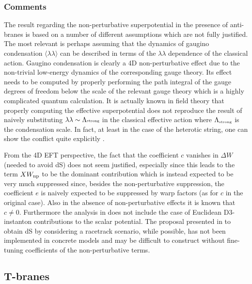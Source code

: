 \documentclass[11pt,a4paper]{article}
\def\strong{{\scriptscriptstyle {\rm strong}}}
\begin{document}
\subsubsection*{Comments}

The result regarding the non-perturbative superpotential in the presence of anti-branes is based on a number of different assumptions which are not fully justified. The most relevant is perhaps assuming that the dynamics of gaugino condensation $\langle \lambda \lambda\rangle $ can be described in terms of the $\lambda\lambda$ dependence of the classical action. Gaugino condensation is clearly a 4D non-perturbative effect due to the non-trivial low-energy dynamics of the corresponding gauge theory. Its effect needs to be computed by properly performing the path integral of the gauge degrees of freedom below the scale of the relevant gauge theory which is a highly complicated quantum calculation. It is actually known in field theory that properly computing the effective superpotential does not reproduce the result of naively substituting $\lambda\lambda\sim \Lambda\strong$ in the classical effective action where $\Lambda_\strong$ is the condensation scale. In fact, at least in the case of the heterotic string, one can show the conflict quite explicitly \cite{Brustein:2004xn,Nilles:2004zg}.

From the 4D EFT perspective, the fact that the coefficient $c$ vanishes in $\Delta W$ (needed to avoid dS) does not seem justified, especially since this leads to the term $X W_{\rm np}$ to be the dominant contribution which is instead expected to be very much suppressed since, besides the non-perturbative suppression, the coefficient $e$ is naively expected to be suppressed by warp factors (as for $c$ in the original case). Also in the absence of non-perturbative effects it is known that $c\neq 0$. Furthermore the analysis in \cite{Moritz:2017xto} does not include the case of Euclidean D3-instanton contributions to the scalar potential. The proposal presented in \cite{Moritz:2017xto} to obtain dS by considering a racetrack scenario, while possible, has not been implemented in concrete models and may be difficult to construct without fine-tuning coefficients of the non-perturbative terms. 


\subsection{T-branes}
\label{T}
\end{document}
